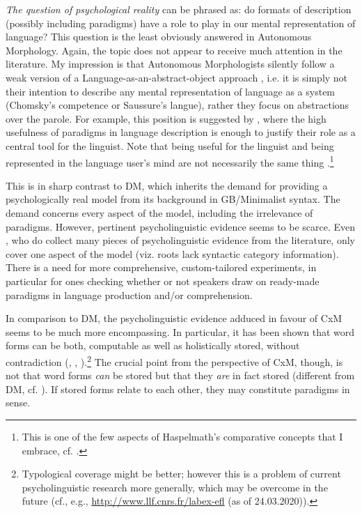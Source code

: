 \documentclass[output=paper]{langsci/langscibook}
\begin{document}
\textit{The question of psychological reality} can be phrased as: do formats of description (possibly including paradigms) have a role to play in our mental representation of language? This question is the least obviously answered in Autonomous Morphology. Again, the topic does not appear to receive much attention in the literature. My impression is that Autonomous Morphologists silently follow a weak version of a Language-as-an-abstract-object approach \citep{Katz1981}, i.e. it is simply not their intention to describe any mental representation of language as a system (Chomsky’s competence or Saussure’s langue), rather they focus on abstractions over the parole. For example, this position is suggested by \citet[197--198]{Aronoff2016}, where the high usefulness of paradigms in language description is enough to justify their role as a central tool for the linguist. Note that being useful for the linguist and being represented in the language user’s mind are not necessarily the same thing \citep[92, fn. 7]{Haspelmath2018}.\footnote{This is one of the few aspects of Haspelmath’s comparative concepts that I embrace, cf. \citet{ReinerInPress}.}

This is in sharp contrast to DM, which inherits the demand for providing a psychologically real model from its background in GB/Minimalist syntax. The demand concerns every aspect of the model, including the irrelevance of paradigms. However, pertinent psycholinguistic evidence seems to be scarce. Even \citet{BarnerBarner2002}, who do collect many pieces of psycholinguistic evidence from the literature, only cover one aspect of the model (viz. roots lack syntactic category information). There is a need for more comprehensive, custom-tailored experiments, in particular for ones checking whether or not speakers draw on ready-made paradigms in language production and/or comprehension.\largerpage

{ In comparison to DM, the psycholinguistic evidence adduced in favour of CxM seems to be much more encompassing. In particular, it has been shown that word forms can be both, computable as well as holistically stored, without contradiction (\citealt{Zwitserlood2018}, \citealt[7–8]{MasiniAudring2019}, \citealt[Ch. 7]{JackendoffAudring2020}).\footnote{Typological coverage might be better; however this is a problem of current psycholinguistic research more generally, which may be overcome in the future (cf., e.g., \url{http://www.llf.cnrs.fr/labex-efl} (as of 24.03.2020)).} The crucial point from the perspective of CxM, though, is not that word forms \textit{can} be stored but that they \textit{are} in fact stored (different from DM, cf. \citealt[392, fn. 3]{McGinnis-Archibald2016}). If stored forms relate to each other, they may constitute paradigms in  sense.}
\end{document}
